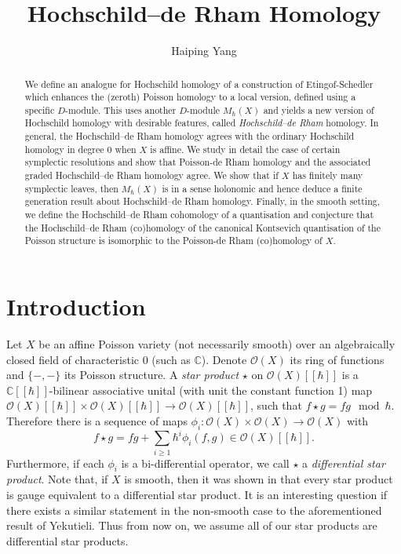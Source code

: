 \documentclass[draft]{article}
\title{\textbf{Hochschild--de Rham Homology}}
\author{Haiping Yang}
\date{}
\theoremstyle{definition}
\newcommand{\doubleh}{[\![ \hbar ]\!]}
\newcommand{\MhX}{M_\hbar(X)}
\newcommand{\OXh}{\mathcal{O}(X)\doubleh}
\begin{document}
\maketitle
\begin{abstract}
We define an analogue for Hochschild homology of a construction of Etingof-Schedler which enhances the (zeroth) Poisson homology to a local version, defined using a specific $D$-module. This uses another $D$-module $\MhX$ and yields a new version of Hochschild homology with desirable features, called \textit{Hochschild--de Rham} homology. In general, the Hochschild--de Rham homology agrees with the ordinary Hochschild homology in degree 0 when $X$ is affine. We study in detail the case of certain symplectic resolutions and show that Poisson-de Rham homology and the associated graded Hochschild--de Rham homology agree. We show that if $X$ has finitely many symplectic leaves, then $\MhX$ is in a sense holonomic and hence deduce a finite generation result about Hochschild--de Rham homology. Finally, in the smooth setting, we define the Hochschild--de Rham cohomology of a quantisation and conjecture that the Hochschild--de Rham (co)homology of the canonical Kontsevich quantisation of the Poisson structure is isomorphic to the Poisson-de Rham (co)homology of $X$.
\end{abstract}


\section{Introduction}

Let $X$ be an affine Poisson variety (not necessarily smooth) over an algebraically closed field of characteristic 0 (such as $\mathbb{C}$). Denote $\mathcal{O}(X)$ its ring of functions and $\{-,-\}$ its Poisson structure.  A \textit{star product} $\star$ on $\OXh$ is a $\mathbb{C}\doubleh$-bilinear associative unital (with unit the constant function 1) map $\OXh\times\OXh\to\OXh$, such that $f\star g=fg \mod \hbar$. Therefore there is a sequence of maps $\phi_i:\mathcal{O}(X)\times\mathcal{O}(X)\to\mathcal{O}(X)$ with $$f\star g=fg+\sum\limits_{i\geq 1} \hbar^i\phi_i(f,g)\in \OXh.$$   Furthermore, if each $\phi_i$ is a  bi-differential operator, we call $\star$ a \textit{differential star product}. Note that, if $X$ is smooth, then it was shown in \cite[Theorem 8.2]{Deformations_of_Affine_Varieties_and_the_Deligne_Crossed_Groupoid} that every star product is gauge equivalent to a differential star product. It is an interesting question if there exists a similar statement in the non-smooth case to the aforementioned result of Yekutieli. Thus from now on, we assume all of our star products are differential star products.
\end{document}
